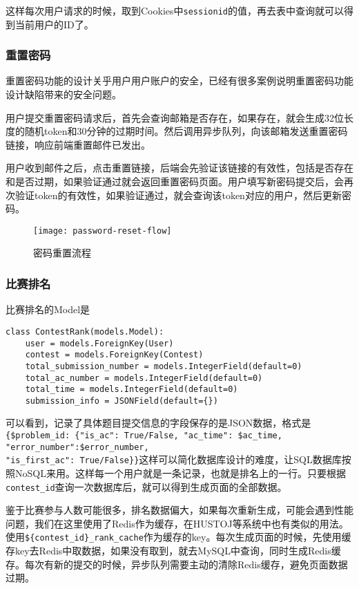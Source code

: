 这样每次用户请求的时候，取到Cookies中\texttt{sessionid}的值，再去表中查询就可以得到当前用户的ID了。

\subsubsection{重置密码}

重置密码功能的设计关乎用户用户账户的安全，已经有很多案例说明重置密码功能设计缺陷带来的安全问题\cite{password-reset-vul}。

用户提交重置密码请求后，首先会查询邮箱是否存在，如果存在，就会生成32位长度的随机token和30分钟的过期时间。然后调用异步队列，向该邮箱发送重置密码链接，响应前端重置邮件已发出。

用户收到邮件之后，点击重置链接，后端会先验证该链接的有效性，包括是否存在和是否过期，如果验证通过就会返回重置密码页面。用户填写新密码提交后，会再次验证token的有效性，如果验证通过，就会查询该token对应的用户，然后更新密码。

\begin{figure}[H]
\centering
\texttt{[image: password-reset-flow]}
\caption{密码重置流程}
\end{figure}

\subsubsection{比赛排名}
比赛排名的Model是
\begin{verbatim}
class ContestRank(models.Model):
    user = models.ForeignKey(User)
    contest = models.ForeignKey(Contest)
    total_submission_number = models.IntegerField(default=0)
    total_ac_number = models.IntegerField(default=0)
    total_time = models.IntegerField(default=0)
    submission_info = JSONField(default={})
\end{verbatim}

可以看到，记录了具体题目提交信息的字段保存的是JSON数据，格式是\texttt{\{\$problem\_id: \{"is\_ac": True/False, "ac\_time": \$ac\_time, "error\_number":\$error\_number, \\"is\_first\_ac": True/False\}\}}这样可以简化数据库设计的难度，让SQL数据库按照NoSQL来用。这样每一个用户就是一条记录，也就是排名上的一行。只要根据\texttt{contest\_id}查询一次数据库后，就可以得到生成页面的全部数据。

鉴于比赛参与人数可能很多，排名数据偏大，如果每次重新生成，可能会遇到性能问题，我们在这里使用了Redis作为缓存，在HUSTOJ等系统中也有类似的用法\cite{hustoj-cache}。使用\texttt{\$\{contest\_id\}\_rank\_cache}作为缓存的key。每次生成页面的时候，先使用缓存key去Redis中取数据，如果没有取到，就去MySQL中查询，同时生成Redis缓存。每次有新的提交的时候，异步队列需要主动的清除Redis缓存，避免页面数据过期。
